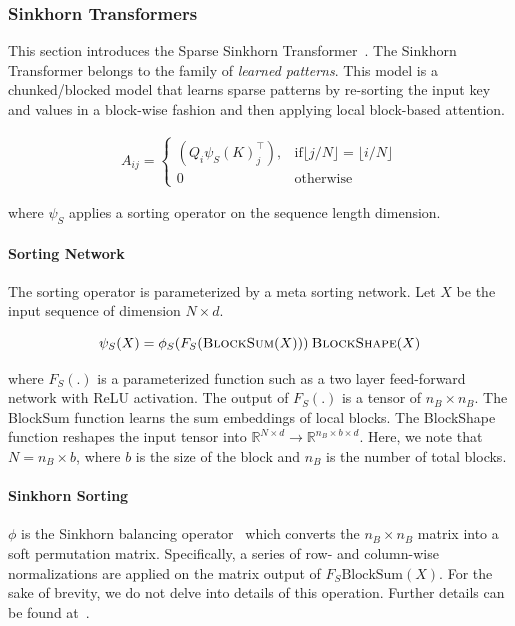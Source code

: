 \subsubsection{Sinkhorn Transformers} This section introduces the Sparse Sinkhorn Transformer~\citep{tay2020sparse}. The Sinkhorn Transformer belongs to the family of \textit{learned patterns}. This model is a chunked/blocked model that learns sparse patterns by re-sorting the input key and values in a block-wise fashion and then applying local block-based attention.

\begin{align*}
    A_{ij} = 
    \begin{cases}
    (Q_{i}\psi_S(K)_{j}^\top),& \text{if} \lfloor{{j}/{N}}\rfloor = \lfloor{i/{N}}\rfloor\\
    0              & \text{otherwise}
\end{cases}
\end{align*}

where $\psi_S$ applies a sorting operator on the sequence length dimension.  

\paragraph{Sorting Network} The sorting operator is parameterized by a meta sorting network. Let $X$ be the input sequence of dimension $N \times d$.

\begin{equation}
\psi_S(X) = \phi_S(F_S(\textsc{BlockSum}(X)))\:\textsc{BlockShape}(X)
\end{equation}

where $F_S(.)$ is a parameterized function such as a two layer feed-forward network with ReLU activation. The output of $F_S(.)$ is a tensor of $n_B \times n_B$. The BlockSum function learns the sum embeddings of local blocks. The BlockShape function reshapes the input tensor into $\mathbb{R}^{N \times d} \rightarrow \mathbb{R}^{n_B \times b \times d}$. Here, we note that $N = n_B \times b$, where $b$ is the size of the block and $n_B$ is the number of total blocks.

\paragraph{Sinkhorn Sorting} $\phi$ is the Sinkhorn balancing operator~\citep{sinkhorn1964relationship, adams2011ranking} which converts the $n_B \times n_B$ matrix into a soft permutation matrix. Specifically, a series of row- and column-wise normalizations are applied on the matrix output of $F_S\text{BlockSum}(X)$. For the sake of brevity, we do not delve into details of this operation. Further details can be found at~\citet{adams2011ranking,tay2020sparse}.
